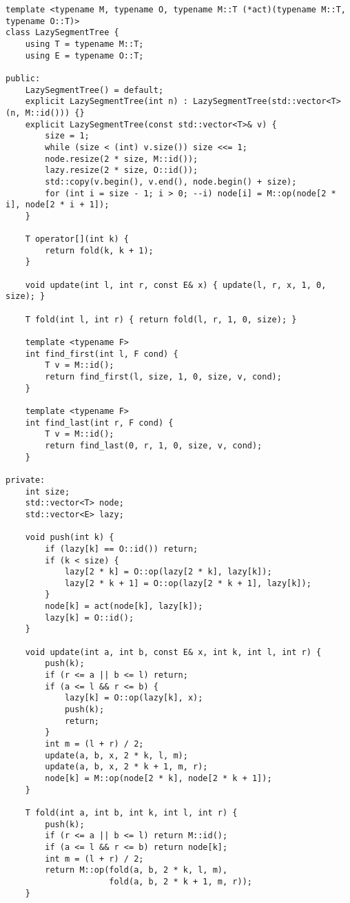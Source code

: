 \begin{lstlisting}
template <typename M, typename O, typename M::T (*act)(typename M::T, typename O::T)>
class LazySegmentTree {
    using T = typename M::T;
    using E = typename O::T;

public:
    LazySegmentTree() = default;
    explicit LazySegmentTree(int n) : LazySegmentTree(std::vector<T>(n, M::id())) {}
    explicit LazySegmentTree(const std::vector<T>& v) {
        size = 1;
        while (size < (int) v.size()) size <<= 1;
        node.resize(2 * size, M::id());
        lazy.resize(2 * size, O::id());
        std::copy(v.begin(), v.end(), node.begin() + size);
        for (int i = size - 1; i > 0; --i) node[i] = M::op(node[2 * i], node[2 * i + 1]);
    }

    T operator[](int k) {
        return fold(k, k + 1);
    }

    void update(int l, int r, const E& x) { update(l, r, x, 1, 0, size); }

    T fold(int l, int r) { return fold(l, r, 1, 0, size); }

    template <typename F>
    int find_first(int l, F cond) {
        T v = M::id();
        return find_first(l, size, 1, 0, size, v, cond);
    }

    template <typename F>
    int find_last(int r, F cond) {
        T v = M::id();
        return find_last(0, r, 1, 0, size, v, cond);
    }

private:
    int size;
    std::vector<T> node;
    std::vector<E> lazy;

    void push(int k) {
        if (lazy[k] == O::id()) return;
        if (k < size) {
            lazy[2 * k] = O::op(lazy[2 * k], lazy[k]);
            lazy[2 * k + 1] = O::op(lazy[2 * k + 1], lazy[k]);
        }
        node[k] = act(node[k], lazy[k]);
        lazy[k] = O::id();
    }

    void update(int a, int b, const E& x, int k, int l, int r) {
        push(k);
        if (r <= a || b <= l) return;
        if (a <= l && r <= b) {
            lazy[k] = O::op(lazy[k], x);
            push(k);
            return;
        }
        int m = (l + r) / 2;
        update(a, b, x, 2 * k, l, m);
        update(a, b, x, 2 * k + 1, m, r);
        node[k] = M::op(node[2 * k], node[2 * k + 1]);
    }

    T fold(int a, int b, int k, int l, int r) {
        push(k);
        if (r <= a || b <= l) return M::id();
        if (a <= l && r <= b) return node[k];
        int m = (l + r) / 2;
        return M::op(fold(a, b, 2 * k, l, m),
                     fold(a, b, 2 * k + 1, m, r));
    }


\end{lstlisting}
